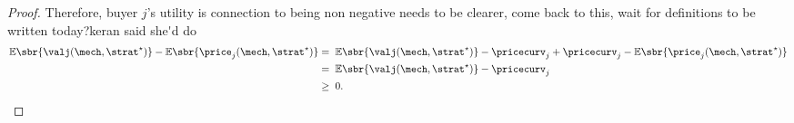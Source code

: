 \begin{proof}
    Therefore, buyer $j$'s utility is 
    \ac{connection to being non negative needs to be clearer, come back to this, wait for definitions to be written today?}\ac{keran said she'd do}
    \begin{align*}
         \mathbb{E}\sbr{\valj(\mech,\strat^{\star})} - \mathbb{E}\sbr{\price_j(\mech,\strat^{\star})}  
         &=   \;\mathbb{E}\sbr{\valj(\mech,\strat^{\star})} - \pricecurv_j + \pricecurv_j -\mathbb{E}\sbr{\price_j(\mech,\strat^{\star})} \\ &=  \; \mathbb{E}\sbr{\valj(\mech,\strat^{\star})} - \pricecurv_j   \\ &\geq  \; 0 .
    \end{align*}
\end{proof}


    
    
    
        
